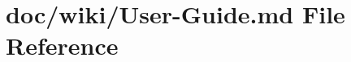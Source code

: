 \hypertarget{_user-_guide_8md}{}\section{doc/wiki/\+User-\/\+Guide.md File Reference}
\label{_user-_guide_8md}

